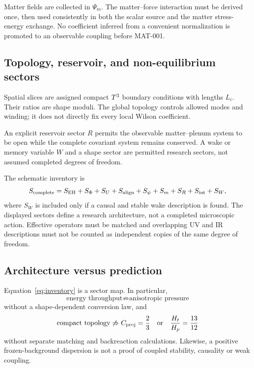 Matter fields are collected in $\Psi_m$.  The matter--force interaction must
be derived once, then used consistently in both the scalar source and the
matter stress-energy exchange.  No coefficient inferred from a convenient
normalization is promoted to an observable coupling before MAT-001.

\subsection{Topology, reservoir, and non-equilibrium sectors}

Spatial slices are assigned compact $T^3$ boundary conditions with lengths
$L_i$.  Their ratios are shape moduli.  The global topology controls allowed
modes and winding; it does not directly fix every local Wilson coefficient.

An explicit reservoir sector $R$ permits the observable matter--plenum system
to be open while the complete covariant system remains conserved.  A wake or
memory variable $W$ and a shape sector are permitted research sectors, not
assumed completed degrees of freedom.

The schematic inventory is
\begin{equation}
 S_{\rm complete}=S_{\rm EH}+S_\Phi+S_U+S_{\rm align}+S_\psi
 +S_m+S_R+S_{\rm int}+S_W,
 \label{eq:inventory}
\end{equation}
where $S_W$ is included only if a causal and stable wake description is found.
The displayed sectors define a research architecture, not a completed
microscopic action.  Effective operators must be matched and overlapping UV
and IR descriptions must not be counted as independent copies of the same
degree of freedom.

\subsection{Architecture versus prediction}

Equation~\eqref{eq:inventory} is a sector map.  In particular,
\begin{equation}
 \text{energy throughput}
 \not\Rightarrow
 \text{anisotropic pressure}
\end{equation}
without a shape-dependent conversion law, and
\begin{equation}
 \text{compact topology}
 \not\Rightarrow
 C_{\mathrm{proj}}=\frac23 \quad\text{or}\quad \frac{H_t}{H_p}=\frac{13}{12}
\end{equation}
without separate matching and backreaction calculations.  Likewise, a
positive frozen-background dispersion is not a proof of coupled stability,
causality or weak coupling.

